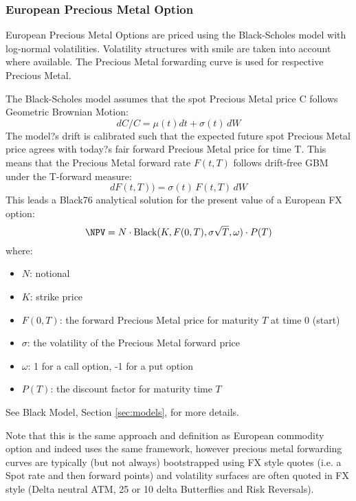 \subsubsection{European Precious Metal Option}
\label{pricing:com_option}

European Precious Metal Options are priced using the Black-Scholes model with log-normal 
volatilities. Volatility structures with smile are taken into account where available. 
The Precious Metal forwarding curve is used for respective Precious Metal.

The Black-Scholes model assumes that the spot Precious Metal price C follows Geometric 
Brownian Motion:
$$
dC/C=\mu(t)dt + \sigma(t)\,dW
$$
The model?s drift is calibrated such that the expected future spot Precious Metal price 
agrees with today?s fair forward Precious Metal price for time T. This means that the 
Precious Metal forward rate $F(t,T)$ follows drift-free GBM under the T-forward measure:
$$
dF(t,T)) = \sigma(t)\,F(t,T)\,dW
$$
This leads a Black76 analytical solution for the present value of a European FX option:
$$
\NPV = N\cdot \mbox{Black}(K, F(0,T), \sigma\sqrt{T},\omega)\cdot P(T)
$$
where:
\begin{itemize}
\item $N$: notional
\item $K$: strike price
\item $F(0,T)$: the forward Precious Metal price for maturity $T$ at time 0 (start)
\item $\sigma$: the volatility of the Precious Metal forward price
\item $\omega$: 1 for a call option, -1 for a put option
\item $P(T)$: the discount factor for maturity time $T$
\end{itemize}

See Black Model, Section \ref{sec:models}, for more details.

Note that this is the same approach and definition as European commodity option and indeed uses the same framework, however precious metal forwarding curves are typically (but not always) bootstrapped using FX style quotes (i.e. a Spot rate and then forward points) and volatility surfaces are often quoted in FX style (Delta neutral ATM, 25 or 10 delta Butterflies and Risk Reversals).

